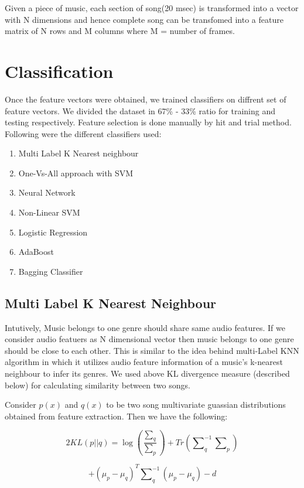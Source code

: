 \documentclass[conference]{IEEEtran}
\begin{document}
Given a piece of music, each section of song(20 msec) is transformed into a vector with N dimensions and hence complete song can be transfomed into a feature matrix of N rows
and M columns where M = number of frames.

\section{Classification}
Once the feature vectors were obtained, we trained classifiers on diffrent set of feature vectors. We divided the dataset in 67\% - 33\% ratio for training and testing respectively. Feature selection is done manually by hit and trial method. Following were the different classifiers used:

\begin{enumerate}
  \item Multi Label K Nearest neighbour
  \item One-Vs-All approach with SVM
  \item Neural Network
  \item Non-Linear SVM
  \item Logistic Regression
  \item AdaBoost
  \item Bagging Classifier
\end{enumerate}


\subsection{Multi Label K Nearest Neighbour}
\label{sub:Multi Label K Nearest Neighbour}

Intutively, Music belongs to one genre should share same audio features. If we consider audio featuers as N dimensional vector then music belongs to one genre should be close to each other. This is similar to the idea behind multi-Label KNN algorithm in which it utilizes audio feature information of a music's k-nearest neighbour to infer its genres. We used above KL divergence measure (described below) for calculating similarity between two songs.

Consider $ p(x) $ and $ q(x) $ to be two song multivariate guassian distributions obtained from feature extraction. Then we have the following:

$$ 2KL(p||q) = \log{\left(\frac{\sum\nolimits_q}{\sum\nolimits_p}\right)} + Tr\left(\sum\nolimits_q^{-1}\sum\nolimits_p\right) $$

$$    + {\left(\mu_p - \mu_q\right)}^{T}\sum\nolimits_q^{-1}(\mu_p - \mu_q) - d $$
\end{document}
